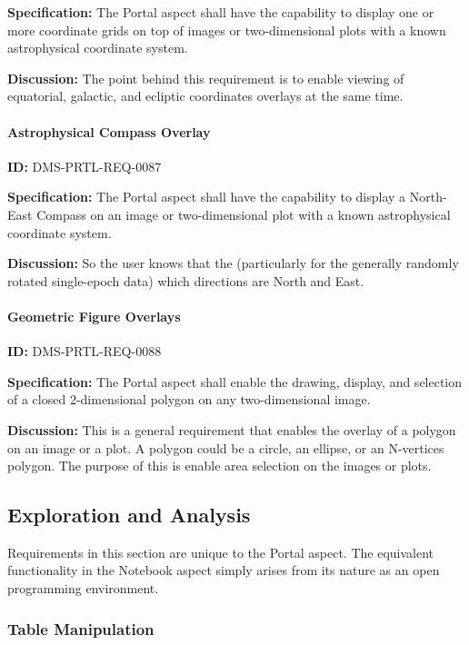 \documentclass[SE,toc,lsstdraft]{lsstdoc}
\begin{document}
\textbf{Specification:}
The Portal aspect shall have the capability to display one or more coordinate grids on top of images or two-dimensional plots with a known astrophysical coordinate system.

\textbf{Discussion:}
The point behind this requirement is to enable viewing of equatorial, galactic, and ecliptic coordinates overlays at the same time.

\paragraph{Astrophysical Compass Overlay}\hfill  %

\label{DMS-PRTL-REQ-0087}
\textbf{ID:} DMS-PRTL-REQ-0087

\textbf{Specification:}
The Portal aspect shall have the capability to display a North-East Compass on an image or two-dimensional plot with a known astrophysical coordinate system.

\textbf{Discussion:}
So the user knows that the (particularly for the generally randomly rotated single-epoch data) which directions are North and East.

\paragraph{Geometric Figure Overlays}\hfill  %

\label{DMS-PRTL-REQ-0088}
\textbf{ID:} DMS-PRTL-REQ-0088

\textbf{Specification:}
The Portal aspect shall enable the drawing, display, and selection of a closed 2-dimensional polygon on any two-dimensional image.

\textbf{Discussion:}
This is a general requirement that enables the overlay of a polygon on an image or a plot.  A polygon could be a circle, an ellipse, or an N-vertices polygon.  The purpose of this is enable area selection on the images or plots.

\subsection{Exploration and Analysis}

Requirements in this section are unique to the Portal aspect.  The equivalent functionality in the Notebook aspect simply arises from its nature as an open programming environment.

\subsubsection{Table Manipulation}
\end{document}
